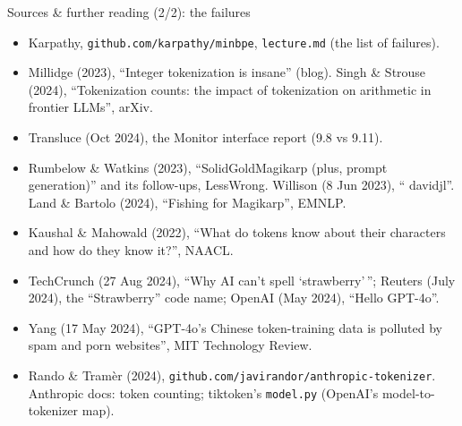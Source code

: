 \documentclass[aspectratio=169]{beamer}
\begin{document}
\begin{frame}{Sources \& further reading (2/2): the failures}
  \footnotesize
  \begin{itemize}
    \item Karpathy, \texttt{github.com/karpathy/minbpe}, \texttt{lecture.md} (the list of failures).
    \item Millidge (2023), ``Integer tokenization is insane'' (blog). Singh \& Strouse (2024),
      ``Tokenization counts: the impact of tokenization on arithmetic in frontier LLMs'', arXiv.
    \item Transluce (Oct 2024), the Monitor interface report (9.8 vs 9.11).
    \item Rumbelow \& Watkins (2023), ``SolidGoldMagikarp (plus, prompt generation)'' and its
      follow-ups, LessWrong. Willison (8 Jun 2023), `` davidjl''. Land \& Bartolo (2024),
      ``Fishing for Magikarp'', EMNLP.
    \item Kaushal \& Mahowald (2022), ``What do tokens know about their characters and how do they
      know it?'', NAACL.
    \item TechCrunch (27 Aug 2024), ``Why AI can't spell `strawberry'\,''; Reuters (July 2024), the
      ``Strawberry'' code name; OpenAI (May 2024), ``Hello GPT-4o''.
    \item Yang (17 May 2024), ``GPT-4o's Chinese token-training data is polluted by spam and porn
      websites'', MIT Technology Review.
    \item Rando \& Tram\`er (2024), \texttt{github.com/javirandor/anthropic-tokenizer}. Anthropic
      docs: token counting; tiktoken's \texttt{model.py} (OpenAI's model-to-tokenizer map).
  \end{itemize}
\end{frame}
\end{document}
